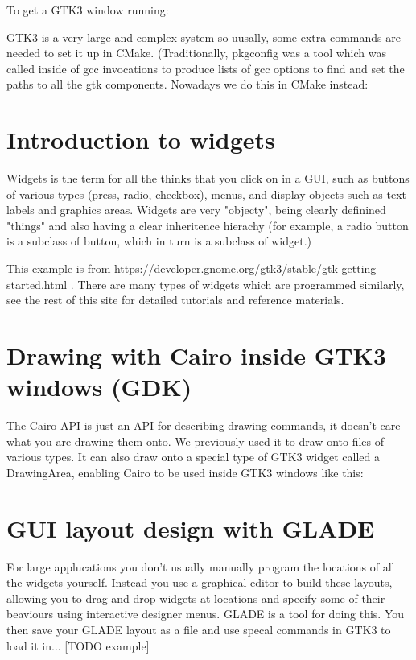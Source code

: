 \documentclass[oneside,english]{scrbook}
\begin{document}
To get a GTK3 window running:


GTK3 is a very large and complex system so uusally, some extra commands are needed to set it up in CMake. (Traditionally, pkgconfig was a tool which was called inside of gcc invocations to produce lists of gcc options to find and set the paths to all the gtk components. Nowadays we do this in CMake instead:




\section{Introduction to widgets}
Widgets is the term for all the thinks that you click on in a GUI, such as buttons of various types (press, radio, checkbox), menus, and display objects such as text labels and graphics areas.   Widgets are very "objecty", being clearly definined "things" and also having a clear inheritence hierachy (for example, a radio button is a subclass of button, which in turn is a subclass of widget.)   




This example is from https://developer.gnome.org/gtk3/stable/gtk-getting-started.html .  There are many types of widgets which are programmed similarly, see the rest of this site for detailed tutorials and reference materials.


\section{Drawing with Cairo inside GTK3 windows (GDK)}
The Cairo API is just an API for describing drawing commands, it doesn't care what you are drawing them onto.   We previously used it to draw onto files of various types.   It can also draw onto a special type of GTK3 widget called a DrawingArea, enabling Cairo to be used inside GTK3 windows like this:




\section{GUI layout design with GLADE}
For large applucations you don't usually manually program the locations of all the widgets yourself. Instead you use a graphical editor to build these layouts, allowing you to drag and drop widgets at locations and specify some of their beaviours using interactive designer menus.    GLADE is a tool for doing this.   You then save your GLADE layout as a file and use specal commands in GTK3 to load it in...  [TODO example]
\end{document}
